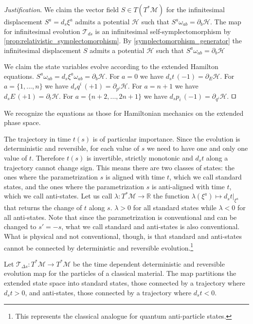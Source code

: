 \documentclass[smallextended]{svjour3}
\numberwithin{equation}{section}
\newenvironment{justification}{\emph{Justification}.}{\hfill\(\qed\)}
\begin{document}
\begin{justification}
We claim the vector field $S \in T(T^*\mathcal{M})$ for the infinitesimal displacement $S^a = d_s\xi^a$ admits a potential $\mathcal{H}$ such that $S^{a} \omega_{ab} = \partial_{b}\mathcal{H}$. The map for infinitesimal evolution $\mathcal{T}_{ds}$ is an infinitesimal self-symplectomorphism by \ref{prop:relativistic_symplectomorphism}. By \ref{symplectomorphism_generator} the infinitesimal displacement $S$ admits a potential $\mathcal{H}$ such that $S^{a} \omega_{ab} = \partial_{b}\mathcal{H}$

We claim the state variables evolve according to the extended Hamilton equations. $S^{a} \omega_{ab} = d_s\xi^a \omega_{ab} = \partial_{b}\mathcal{H}$. For $a = 0$ we have $d_s t \, (-1) = \partial_{E} \mathcal{H}$. For  $a=\{1,...,n\}$ we have $d_s q^i \, (+1) = \partial_{p^i} \mathcal{H}$. For $a=n+1$ we have $d_s E \, (+1) = \partial_{t} \mathcal{H}$. For $a=\{n+2,...,2n + 1\}$ we have $d_s p_i \, (-1) = \partial_{q^i} \mathcal{H}$.
\end{justification}

We recognize the equations as those for Hamiltonian mechanics on the extended phase space.\cite{Synge,Lanczos,Struckmeier}

The trajectory in time $t(s)$ is of particular importance. Since the evolution is deterministic and reversible, for each value of $s$ we need to have one and only one value of $t$. Therefore $t(s)$ is invertible, strictly monotonic and $d_{s}t$ along a trajectory cannot change sign. This means there are two classes of states: the ones where the parametrization $s$ is aligned with time $t$, which we call standard states, and the ones where the parametrization $s$ is anti-aligned with time $t$, which we call anti-states. Let us call $\lambda : T^*\mathcal{M} \rightarrow \mathbb{R}$ the function $\lambda (\xi^a) \mapsto d_s t |_{\xi^a}$ that returns the change of $t$ along $s$. $\lambda > 0$ for all standard states while $\lambda < 0$ for all anti-states.  Note that since the parametrization is conventional and can be changed to $s'=-s$, what we call standard and anti-states is also conventional. What is physical and not conventional, though, is that standard and anti-states cannot be connected by deterministic and reversible evolution.\footnote{This represents the classical analogue for quantum anti-particle states.}

\begin{prop}\label{prop:antistates}
	Let $\mathcal{T}_{\Delta s}: T^*\mathcal{M} \rightarrow T^*\mathcal{M}$ be the time dependent deterministic and reversible evolution map for the particles of a classical material. The map partitions the extended state space into standard states, those connected by a trajectory where $d_{s}t>0$, and anti-states, those connected by a trajectory where $d_{s}t<0$.
\end{prop}
\end{document}
